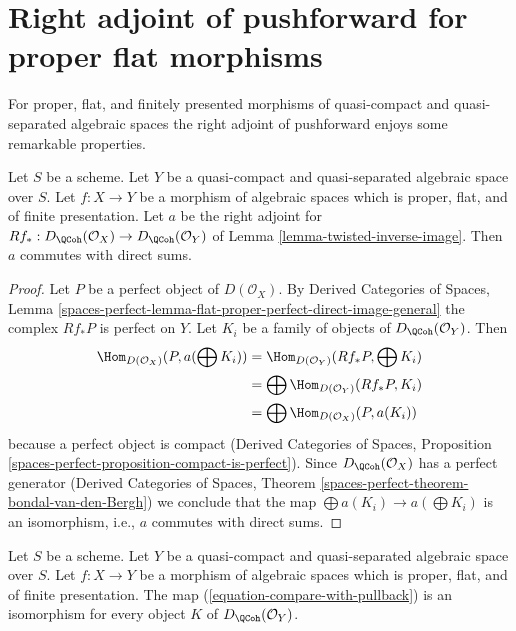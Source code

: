 \section{Right adjoint of pushforward for proper flat morphisms}
\label{section-proper-flat}

\noindent
For proper, flat, and finitely presented morphisms of quasi-compact
and quasi-separated algebraic spaces the right adjoint of pushforward
enjoys some remarkable properties.

\begin{lemma}
\label{lemma-proper-flat}
Let $S$ be a scheme.
Let $Y$ be a quasi-compact and quasi-separated algebraic space over $S$.
Let $f : X \to Y$ be a morphism of algebraic spaces which is proper, flat, and
of finite presentation.
Let $a$ be the right adjoint for
$Rf_* : D_\QCoh(\mathcal{O}_X) \to D_\QCoh(\mathcal{O}_Y)$ of
Lemma \ref{lemma-twisted-inverse-image}. Then $a$ commutes with direct sums.
\end{lemma}

\begin{proof}
Let $P$ be a perfect object of $D(\mathcal{O}_X)$. By
Derived Categories of Spaces, Lemma
\ref{spaces-perfect-lemma-flat-proper-perfect-direct-image-general}
the complex $Rf_*P$ is perfect on $Y$.
Let $K_i$ be a family of objects of $D_\QCoh(\mathcal{O}_Y)$.
Then
\begin{align*}
\Hom_{D(\mathcal{O}_X)}(P, a(\bigoplus K_i))
& =
\Hom_{D(\mathcal{O}_Y)}(Rf_*P, \bigoplus K_i) \\
& =
\bigoplus \Hom_{D(\mathcal{O}_Y)}(Rf_*P, K_i) \\
& =
\bigoplus \Hom_{D(\mathcal{O}_X)}(P, a(K_i))
\end{align*}
because a perfect object is compact (Derived Categories of Spaces,
Proposition \ref{spaces-perfect-proposition-compact-is-perfect}).
Since $D_\QCoh(\mathcal{O}_X)$ has a perfect generator
(Derived Categories of Spaces, Theorem
\ref{spaces-perfect-theorem-bondal-van-den-Bergh})
we conclude that the map $\bigoplus a(K_i) \to a(\bigoplus K_i)$
is an isomorphism, i.e., $a$ commutes with direct sums.
\end{proof}

\begin{lemma}
\label{lemma-compare-with-pullback-flat-proper}
Let $S$ be a scheme.
Let $Y$ be a quasi-compact and quasi-separated algebraic space over $S$.
Let $f : X \to Y$ be a morphism of algebraic spaces which is proper, flat, and
of finite presentation.
The map (\ref{equation-compare-with-pullback}) is an isomorphism
for every object $K$ of $D_\QCoh(\mathcal{O}_Y)$.
\end{lemma}

